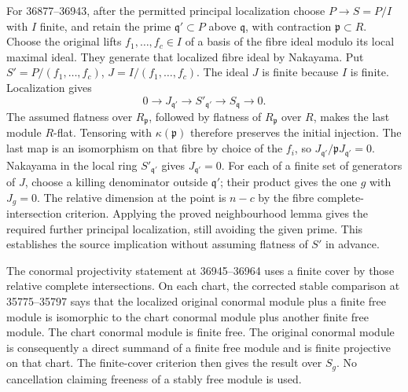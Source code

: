 For 36877--36943, after the permitted principal localization choose \(P\to S=P/I\) with \(I\) finite, and retain the prime \(\mathfrak q'\subset P\) above \(\mathfrak q\), with contraction \(\mathfrak p\subset R\). Choose the original lifts \(f_1,\ldots,f_c\in I\) of a basis of the fibre ideal modulo its local maximal ideal. They generate that localized fibre ideal by Nakayama. Put \(S'=P/(f_1,\ldots,f_c)\), \(J=I/(f_1,\ldots,f_c)\). The ideal \(J\) is finite because \(I\) is finite. Localization gives \[
0\to J_{\mathfrak q'}\to S'_{\mathfrak q'}\to S_{\mathfrak q}\to0.
\] The assumed flatness over \(R_{\mathfrak p}\), followed by flatness of \(R_{\mathfrak p}\) over \(R\), makes the last module \(R\)-flat. Tensoring with \(\kappa(\mathfrak p)\) therefore preserves the initial injection. The last map is an isomorphism on that fibre by choice of the \(f_i\), so \(J_{\mathfrak q'}/\mathfrak pJ_{\mathfrak q'}=0\). Nakayama in the local ring \(S'_{\mathfrak q'}\) gives \(J_{\mathfrak q'}=0\). For each of a finite set of generators of \(J\), choose a killing denominator outside \(\mathfrak q'\); their product gives the one \(g\) with \(J_g=0\). The relative dimension at the point is \(n-c\) by the fibre complete-intersection criterion. Applying the proved neighbourhood lemma gives the required further principal localization, still avoiding the given prime. This establishes the source implication without assuming flatness of \(S'\) in advance.

The conormal projectivity statement at 36945--36964 uses a finite cover by those relative complete intersections. On each chart, the corrected stable comparison at 35775--35797 says that the localized original conormal module plus a finite free module is isomorphic to the chart conormal module plus another finite free module. The chart conormal module is finite free. The original conormal module is consequently a direct summand of a finite free module and is finite projective on that chart. The finite-cover criterion then gives the result over \(S_g\). No cancellation claiming freeness of a stably free module is used.

